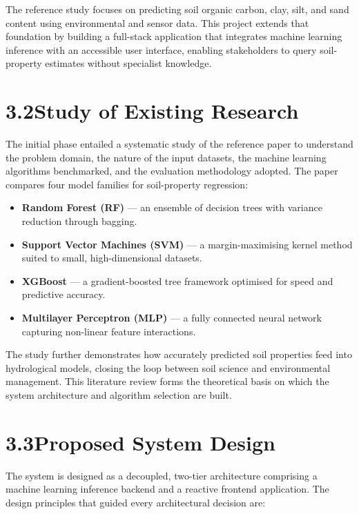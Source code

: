 \documentclass[12pt,a4paper]{article}
\begin{document}
The reference study focuses on predicting soil organic carbon, clay, silt, and
sand content using environmental and sensor data.  This project extends that
foundation by building a full-stack application that integrates machine
learning inference with an accessible user interface, enabling stakeholders to
query soil-property estimates without specialist knowledge.

\section{3.2\quad Study of Existing Research}

The initial phase entailed a systematic study of the reference paper to
understand the problem domain, the nature of the input datasets, the machine
learning algorithms benchmarked, and the evaluation methodology adopted.  The
paper compares four model families for soil-property regression:

\begin{itemize}
  \item \textbf{Random Forest (RF)} --- an ensemble of decision trees with
        variance reduction through bagging.
  \item \textbf{Support Vector Machines (SVM)} --- a margin-maximising kernel
        method suited to small, high-dimensional datasets.
  \item \textbf{XGBoost} --- a gradient-boosted tree framework optimised for
        speed and predictive accuracy.
  \item \textbf{Multilayer Perceptron (MLP)} --- a fully connected neural
        network capturing non-linear feature interactions.
\end{itemize}

The study further demonstrates how accurately predicted soil properties feed
into hydrological models, closing the loop between soil science and
environmental management.  This literature review forms the theoretical basis
on which the system architecture and algorithm selection are built.

\section{3.3\quad Proposed System Design}

The system is designed as a decoupled, two-tier architecture comprising a
machine learning inference backend and a reactive frontend application.  The
design principles that guided every architectural decision are:
\end{document}

